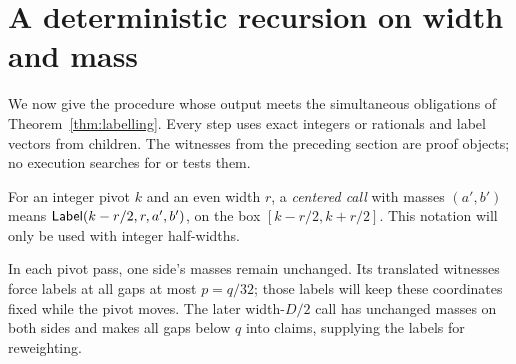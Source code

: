 \section{A deterministic recursion on width and mass}
\label{sec:algorithm}

We now give the procedure whose output meets the simultaneous
obligations of Theorem~\ref{thm:labelling}. Every step uses exact
integers or rationals and label vectors from children. The witnesses
from the preceding section are proof objects; no execution searches
for or tests them.

For an integer pivot $k$ and an even width $r$, a \emph{centered
call} with masses $(a',b')$ means
$\mathsf{Label}(k-r/2,r,a',b')$, on the box $[k-r/2,k+r/2]$.
This notation will only be used with integer half-widths.

In each pivot pass, one side's masses remain unchanged. Its translated
witnesses force labels at all gaps at most $p=q/32$; those labels will
keep these coordinates fixed while the pivot moves. The later
width-$D/2$ call has unchanged masses on both sides and makes all gaps
below $q$ into claims, supplying the labels for reweighting.

